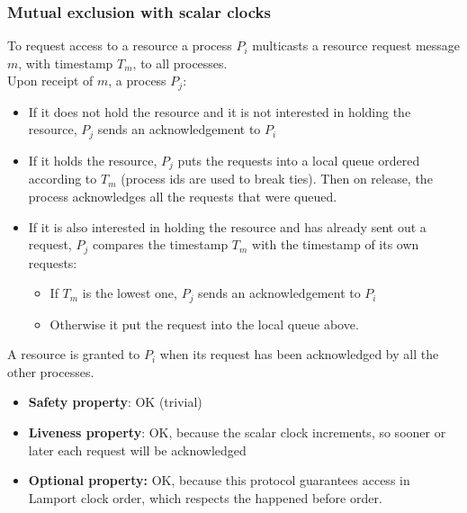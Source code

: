 \documentclass[10pt,a4paper]{article}
\begin{document}
\subsubsection{Mutual exclusion with scalar clocks}
To request access to a resource a process $P_i$ multicasts a resource request message $m$, with timestamp $T_m$, to all processes. \\
Upon receipt of $m$, a process $P_j$:
\begin{itemize}
	\item If it does not hold the resource and it is not interested in holding the resource, $P_j$ sends an acknowledgement to $P_i$
	\item If it holds the resource, $P_j$ puts the requests into a local queue ordered according to $T_m$ (process ids are used to break ties). Then on release, the process acknowledges all the requests that were queued.
	\item If it is also interested in holding the resource and has already sent out a request, $P_j$ compares the timestamp $T_m$ with the timestamp of its own requests: 
	\begin{itemize}
		\item If $T_m$ is the lowest one, $P_j$ sends an acknowledgement to $P_i$
		\item Otherwise it put the request into the local queue above.
	\end{itemize}
\end{itemize}
A resource is granted to $P_i$ when its request has been acknowledged by all the other processes.
\begin{itemize}
 	\item \textbf{Safety property}: OK (trivial)
 	\item \textbf{Liveness property}: OK, because the scalar clock increments, so sooner or later each request will be acknowledged
 	\item \textbf{Optional property:} OK, because this protocol guarantees access in Lamport clock order, which respects the happened before order.
\end{itemize}
\end{document}
